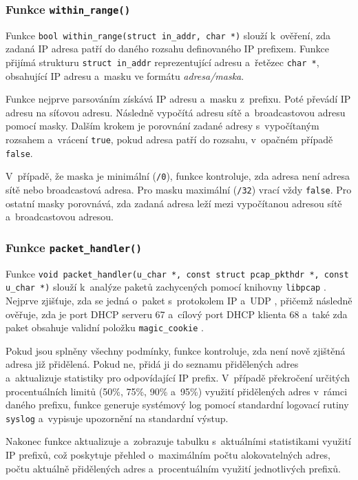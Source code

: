 \documentclass[a4paper, 11pt]{article}
\begin{document}
\subsubsection{Funkce \texttt{within\_range()}}
Funkce \texttt{bool within\_range(struct in\_addr, char *)} slouží k~ověření, zda zadaná IP adresa patří do daného rozsahu definovaného IP prefixem.
Funkce přijímá strukturu \texttt{struct in\_addr} reprezentující adresu a~řetězec \texttt{char *}, obsahující IP adresu a~masku ve formátu \textit{adresa/maska}.

Funkce nejprve parsováním získává IP adresu a~masku z~prefixu.
Poté převádí IP adresu na síťovou adresu.
Následně vypočítá adresu sítě a~broadcastovou adresu pomocí masky.
Dalším krokem je porovnání zadané adresy s~vypočítaným rozsahem a~vrácení \texttt{true}, pokud adresa patří do rozsahu, v~opačném případě \texttt{false}.

V~případě, že maska je minimální (\texttt{/0}), funkce kontroluje, zda adresa není adresa sítě nebo broadcastová adresa.
Pro masku maximální (\texttt{/32}) vrací vždy \texttt{false}.
Pro ostatní masky porovnává, zda zadaná adresa leží mezi vypočítanou adresou sítě a~broadcastovou adresou.

\subsubsection{Funkce \texttt{packet\_handler()}}
Funkce \texttt{void packet\_handler(u\_char *, const struct pcap\_pkthdr *, const u\_char *)} slouží k~analýze paketů zachycených pomocí knihovny \texttt{libpcap} \cite{pcap}.
Nejprve zjišťuje, zda se jedná o~paket s~protokolem IP a~UDP \cite{udp}, přičemž následně ověřuje, zda je port DHCP serveru 67 a~cílový port DHCP klienta 68 a~také zda paket obsahuje validní položku \texttt{magic\_cookie} \cite{rfc2131}.

Pokud jsou splněny všechny podmínky, funkce kontroluje, zda není nově zjištěná adresa již přidělená.
Pokud ne, přidá ji do seznamu přidělených adres a~aktualizuje statistiky pro odpovídající IP prefix.
V~případě překročení určitých procentuálních limitů (50\%, 75\%, 90\% a~95\%) využití přidělených adres v~rámci daného prefixu, funkce generuje systémový log pomocí standardní logovací rutiny \texttt{syslog} \cite{syslog} a~vypisuje upozornění na standardní výstup.

Nakonec funkce aktualizuje a~zobrazuje tabulku s~aktuálními statistikami využití IP prefixů, což poskytuje přehled o~maximálním počtu alokovatelných adres, počtu aktuálně přidělených adres a~procentuálním využití jednotlivých prefixů.
\end{document}
